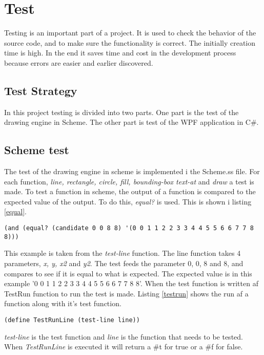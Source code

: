 \chapter{Test}
\label{chp:test}

Testing is an important part of a project. It is used to check the behavior of the source code, and to make sure the functionality is correct. The initially creation time is high. In the end it saves time and cost in the development process because errors are easier and earlier discovered.

\section{Test Strategy}
In this project testing is divided into two parts. One part is the test of the drawing engine in Scheme. The other part is test of the WPF application in C\#.

\section{Scheme test}
The test of the drawing engine in scheme  is implemented i the Scheme.ss file. For each function, \emph{line, rectangle, circle, fill, bounding-box text-at} and \emph{draw} a test is made. To test a function in scheme, the output of a function is compared to the expected value of the output. To do this, \emph{equal?} is used. This is shown i listing \ref{equal}.

\begin{lstlisting}[caption={Comparison of actual output with the expected output with equal?}, label=equal]
(and (equal? (candidate 0 0 8 8) '(0 0 1 1 2 2 3 3 4 4 5 5 6 6 7 7 8 8)))
\end{lstlisting}

This example is taken from the \emph{test-line} function. The line function takes 4 parameters, \emph{x, y, x2} and \emph{y2}. The test feeds the parameter 0, 0, 8 and 8, and compares to see if it is equal to what is expected. The expected value is in this example '0 0 1 1 2 2 3 3 4 4 5 5 6 6 7 7 8 8'. When the test function is written af TestRun function to run the test is made. Listing \ref{testrun} shows the run af a function along with it's test function. 

\begin{lstlisting}[caption={TestRunLine}, label=testrun]
(define TestRunLine (test-line line))
\end{lstlisting}

\emph{test-line} is the test function and \emph{line} is the function that needs to be tested. When \emph{TestRunLine} is executed it will return a \#t for true or a \#f for false.

